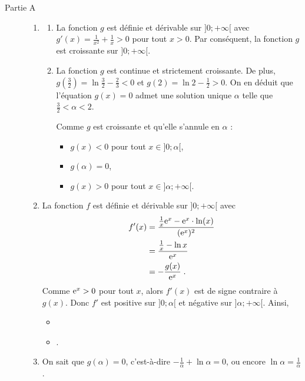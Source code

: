\begin{description}
	\item[Partie A]
		\begin{enumerate}
			\item 
				\begin{enumerate}
					\item {}
						La fonction $g$ est d\'efinie et d\'erivable sur $]0 ; +\infty[$ avec 
						$g'(x) = \frac{1}{x^2} + \frac{1}{x} > 0 $ pour tout $x > 0$.
						Par cons\'equent, la fonction $g$ est croissante sur $]0;+\infty[$.
					\item {}
							La fonction $g$ est continue et strictement croissante.
							De plus, $g\left(\frac{3}{2}\right) = \ln \frac{3}{2} - \frac{2}{3} < 0$
							et $g(2) = \ln 2 - \frac{1}{2} > 0$.
							On en d\'eduit que l'\'equation $g(x)=0$ admet une solution unique $\alpha$ telle que
							$\frac{3}{2}<\alpha<2$.
							
								Comme $g$ est croissante et qu'elle s'annule en $\alpha$ :
									\begin{itemize}
										\item $g(x) < 0$ pour tout $x \in ]0 ; \alpha[$,
										\item $g(\alpha) = 0$,
										\item $g(x) > 0$ pour tout $x \in ]\alpha ; +\infty[$.
									\end{itemize}
				\end{enumerate}
			\item {}
				La fonction $f$ est d\'efinie et d\'erivable sur $]0 ; +\infty[$ avec
				\begin{align*}
					f'(x) 	& = \frac{ \frac{1}{x} \mathrm{e}^{x} - \mathrm{e}^{x} \cdot \ln (x)}{(\mathrm{e}^{x})^2}			\\
							& = \frac{\frac{1}{x} - \ln x}{\mathrm{e}^{x}}												\\
							& = -\frac{g(x)}{\mathrm{e}^{x}}																	\;.
				\end{align*}
				Comme $\mathrm{e}^{x} > 0$ pour tout $x$, alors $f'(x)$ est de signe contraire \`a $g(x)$.
				Donc $f'$ est positive sur $]0 ; \alpha[$ et n\'egative sur $]\alpha ; +\infty[$.
				Ainsi,
					\begin{itemize}
						\item \ansbox{Sur $]0 ; \alpha[$ : $f$ est croissante,}
						\item \ansbox{Sur $[\alpha ; +\infty[$ : $f$ est d\'ecroissante}.
					\end{itemize}
			\item 
					On sait que $g(\alpha) = 0$, c'est-\`a-dire $-\frac{1}{\alpha} + \ln \alpha = 0$, 
					ou encore $\ln \alpha = \frac{1}{\alpha}$.
					

\end{enumerate}
\end{description}
